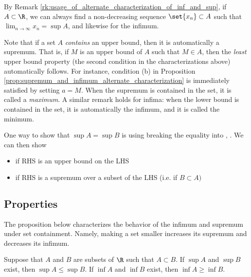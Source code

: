 \documentclass{article} %
\begin{document}
\begin{remark}{}
By Remark \ref{rk:usage_of_alternate_characterization_of_inf_and_sup}, if $A \subset \R$, we can always find a non-decreasing sequence $\set{x_n} \subset A$ such that $\lim_{n \to \infty} x_n = \sup A$, and likewise for the infimum.  
\label{rk:existence_of_sequences_converging_to_infimum_and_supremum}
\end{remark}

\begin{remark}{}
Note that if a set $A$ \textit{contains} an upper bound, then it is automatically a supremum.  That is, if $M$ is an upper bound of $A$ such that $M \in A$, then the \textit{least} upper bound property (the second condition in the characterizations above) automatically follows.  For instance, condition (b) in Proposition \ref{prop:supremum_and_infimum_alternate_characterization} is immediately satisfied by setting $a=M$.   When the supremum is contained in the set, it is called a \textit{maximum}.   A similar remark holds for infima: when the lower bound is contained in the set, it is automatically the infimum, and it is called the minimum.
\label{rk:when_upper_or_lower_bound_is_contained_in_the_set_itself} 
\end{remark}


\begin{remark}
One way to show that $\sup A = \sup B$ is using breaking the equality into \framebox{$\leq$}, \framebox{$\geq$}.  We can then show
\begin{itemize}
\item \framebox{$\leq$} if RHS is an upper bound on the LHS
\item \framebox{$\geq$} if RHS is a supremum over a subset of the LHS (i.e. if $B \subset A)$	
\end{itemize}
\label{rk:one_way_to_show_two_supremums_are_equal}
\end{remark}

\subsection{Properties}

The proposition below characterizes the behavior of the infimum and supremum under set containment. Namely, making a set smaller increases its supremum and decreases its infimum. 

\begin{proposition}
Suppose that $A$ and $B$ are subsets of $\R$ such that $A \subset B$.  If $\sup A$ and $\sup B$ exist, then $\sup A \leq \sup B$.  If $\inf A$ and $\inf B$ exist, then $\inf A \geq \inf B$.
\label{prop:sup_and_inf_for_subsets_are_tighter}
\end{proposition}
\end{document}
